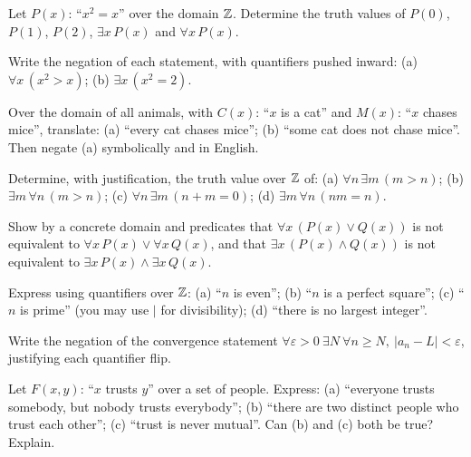 \begin{exercise}{\easy}
Let $P(x)$: ``$x^2 = x$'' over the domain $\mathbb{Z}$. Determine the truth values of
$P(0)$, $P(1)$, $P(2)$, $\exists x\,P(x)$ and $\forall x\,P(x)$.
\end{exercise}

\begin{exercise}{\easy}
Write the negation of each statement, with quantifiers pushed inward:
(a) $\forall x\, (x^2 > x)$;\quad
(b) $\exists x\, (x^2 = 2)$.
\end{exercise}

\begin{exercise}{\easy}
Over the domain of all animals, with $C(x)$: ``$x$ is a cat'' and $M(x)$:
``$x$ chases mice'', translate: (a) ``every cat chases mice'';
(b) ``some cat does not chase mice''. Then negate (a) symbolically and in
English.
\end{exercise}

\begin{exercise}{\medium}
Determine, with justification, the truth value over $\mathbb{Z}$ of:
(a) $\forall n\, \exists m\, (m > n)$;\quad
(b) $\exists m\, \forall n\, (m > n)$;\quad
(c) $\forall n\, \exists m\, (n + m = 0)$;\quad
(d) $\exists m\, \forall n\, (nm = n)$.
\end{exercise}

\begin{exercise}{\medium}
Show by a concrete domain and predicates that
$\forall x\,(P(x) \vee Q(x))$ is not equivalent to
$\forall x\,P(x) \vee \forall x\,Q(x)$, and that
$\exists x\,(P(x) \wedge Q(x))$ is not equivalent to
$\exists x\,P(x) \wedge \exists x\,Q(x)$.
\end{exercise}

\begin{exercise}{\medium}
Express using quantifiers over $\mathbb{Z}$: (a) ``$n$ is even''; (b) ``$n$ is a
perfect square''; (c) ``$n$ is prime'' (you may use $\mid$ for divisibility);
(d) ``there is no largest integer''.
\end{exercise}

\begin{exercise}{\medium}
Write the negation of the convergence statement
$\forall \varepsilon > 0\ \exists N\ \forall n \geq N,\ |a_n - L| <
\varepsilon$, justifying each quantifier flip.
\end{exercise}

\begin{exercise}{\hard}
Let $F(x,y)$: ``$x$ trusts $y$'' over a set of people. Express:
(a) ``everyone trusts somebody, but nobody trusts everybody'';
(b) ``there are two distinct people who trust each other'';
(c) ``trust is never mutual''. Can (b) and (c) both be true? Explain.
\end{exercise}

